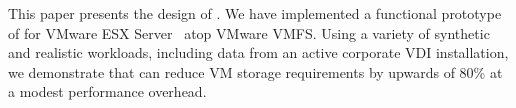 


This paper presents the design of \DeDe.  We have implemented a
functional prototype of \DeDe for VMware ESX Server~\cite{esx-doc}
atop VMware VMFS.  Using a variety of synthetic and realistic
workloads, including data from an active corporate VDI installation,
we demonstrate that \DeDe can reduce VM storage requirements by
upwards of 80\% at a modest performance overhead.




